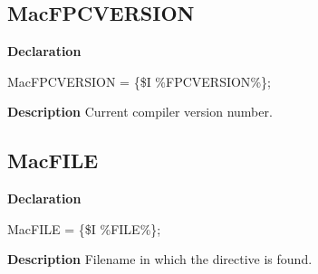 \documentclass{report}
\begin{document}
\subsection*{MacFPCVERSION}
\begin{list}{}{
\setlength{\itemindent}{0cm}
\setlength{\listparindent}{0cm}
\setlength{\leftmargin}{\evensidemargin}
\addtolength{\leftmargin}{\tmplength}
\settowidth{\labelsep}{X}
\addtolength{\leftmargin}{\labelsep}
\setlength{\labelwidth}{\tmplength}
}
\begin{flushleft}
\item[\textbf{Declaration}\hfill]
\begin{ttfamily}
MacFPCVERSION = {\{}{\$}I {\%}FPCVERSION{\%}{\}};\end{ttfamily}


\end{flushleft}
\par
\item[\textbf{Description}]
Current compiler version number.

\end{list}
\subsection*{MacFILE}
\begin{list}{}{
\setlength{\itemindent}{0cm}
\setlength{\listparindent}{0cm}
\setlength{\leftmargin}{\evensidemargin}
\addtolength{\leftmargin}{\tmplength}
\settowidth{\labelsep}{X}
\addtolength{\leftmargin}{\labelsep}
\setlength{\labelwidth}{\tmplength}
}
\begin{flushleft}
\item[\textbf{Declaration}\hfill]
\begin{ttfamily}
MacFILE = {\{}{\$}I {\%}FILE{\%}{\}};\end{ttfamily}


\end{flushleft}
\par
\item[\textbf{Description}]
Filename in which the directive is found.

\end{list}
\end{document}

